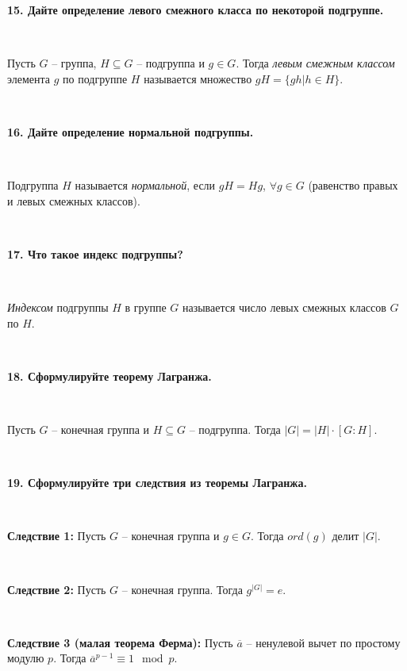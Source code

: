 \documentclass{article}
\begin{document}
    \textbf{15. Дайте определение левого смежного класса по некоторой подгруппе.}

    {
        $\;$
        \setlength{\parindent}{0.4cm}
        \hangindent=0.4cm

    Пусть $G$ -- группа, $H\subseteq G$ --  подгруппа и $g\in G$. Тогда \textit{левым смежным классом} элемента $g$ по подгруппе $H$ называется множество $gH=\{gh|h\in H \}$.

        $\;$
        \setlength{\parindent}{0cm}
        \hangindent=0cm
    }

    \textbf{16. Дайте определение нормальной подгруппы.}

    {
        $\;$
        \setlength{\parindent}{0.4cm}
        \hangindent=0.4cm

    Подгруппа $H$ называется \textit{нормальной}, если $gH=Hg$, $\forall g\in G$ (равенство правых и левых смежных классов).

        $\;$
        \setlength{\parindent}{0cm}
        \hangindent=0cm
    }

    \textbf{17. Что такое индекс подгруппы?}

    {
        $\;$
        \setlength{\parindent}{0.4cm}
        \hangindent=0.4cm

    \textit{Индексом} подгруппы $H$ в группе $G$ называется число левых смежных классов $G$ по $H$.

        $\;$
        \setlength{\parindent}{0cm}
        \hangindent=0cm
    }

    \textbf{18. Сформулируйте теорему Лагранжа.}

    {
        $\;$
        \setlength{\parindent}{0.4cm}
        \hangindent=0.4cm

    Пусть $G$ -- конечная группа и $H\subseteq G$ -- подгруппа. Тогда $|G|=|H|\cdot[G:H]$.

        $\;$
        \setlength{\parindent}{0cm}
        \hangindent=0cm
    }



    \textbf{19. Сформулируйте три следствия из теоремы Лагранжа.}

    {
        $\;$
        \setlength{\parindent}{0.4cm}
        \hangindent=0.4cm

    \textbf{Следствие 1:} Пусть $G$ -- конечная группа и $g\in G$. Тогда $ord(g)$ делит $|G|$.

        $\;$

        \textbf{Следствие 2:} Пусть $G$ -- конечная группа. Тогда $g^{|G|}=e$.

        $\;$

        \textbf{Следствие 3 (малая теорема Ферма):}
        Пусть $\overline a $ -- ненулевой вычет по простому модулю $p$. Тогда $\overline{a}^{p-1}\equiv1\mod p$.

        $\;$
        \setlength{\parindent}{0cm}
        \hangindent=0cm
    }
\end{document}
